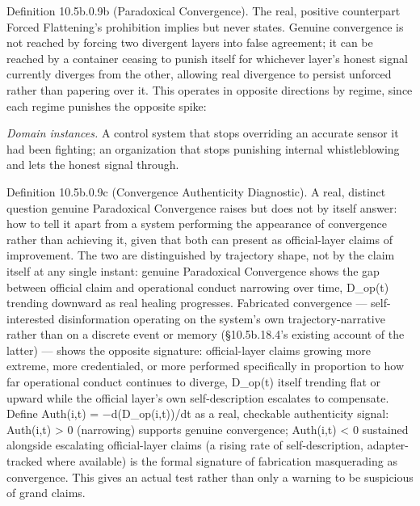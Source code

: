 \documentclass[
]{article}
\begin{document}
Definition 10.5b.0.9b (Paradoxical Convergence). The real, positive
counterpart Forced Flattening's prohibition implies but never states.
Genuine convergence is not reached by forcing two divergent layers into
false agreement; it can be reached by a container ceasing to punish
itself for whichever layer's honest signal currently diverges from the
other, allowing real divergence to persist unforced rather than papering
over it. This operates in opposite directions by regime, since each
regime punishes the opposite spike:

\emph{Domain instances.} A control system that stops overriding an
accurate sensor it had been fighting; an organization that stops
punishing internal whistleblowing and lets the honest signal through.

Definition 10.5b.0.9c (Convergence Authenticity Diagnostic). A real,
distinct question genuine Paradoxical Convergence raises but does not by
itself answer: how to tell it apart from a system performing the
appearance of convergence rather than achieving it, given that both can
present as official-layer claims of improvement. The two are
distinguished by trajectory shape, not by the claim itself at any single
instant: genuine Paradoxical Convergence shows the gap between official
claim and operational conduct narrowing over time, D\_op(t) trending
downward as real healing progresses. Fabricated convergence ---
self-interested disinformation operating on the system's own
trajectory-narrative rather than on a discrete event or memory
(§10.5b.18.4's existing account of the latter) --- shows the opposite
signature: official-layer claims growing more extreme, more
credentialed, or more performed specifically in proportion to how far
operational conduct continues to diverge, D\_op(t) itself trending flat
or upward while the official layer's own self-description escalates to
compensate. Define Auth(i,t) = −d(D\_op(i,t))/dt as a real, checkable
authenticity signal: Auth(i,t) \textgreater{} 0 (narrowing) supports
genuine convergence; Auth(i,t) \textless{} 0 sustained alongside
escalating official-layer claims (a rising rate of self-description,
adapter-tracked where available) is the formal signature of fabrication
masquerading as convergence. This gives an actual test rather than only
a warning to be suspicious of grand claims.
\end{document}
